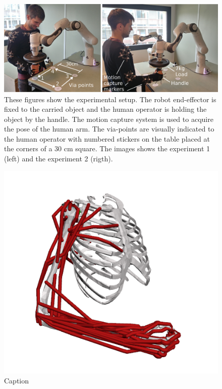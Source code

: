 \begin{figure}[!t]
    \centering
    \includegraphics[width=\linewidth]{Papers/images/both_pose_explanation.jpg}
    \caption{{These figures show the experimental setup. The robot end-effector is fixed to the carried object and the human operator is holding the object by the handle. The motion capture system is used to acquire the pose of the human arm. The via-points are visually indicated to the human operator with numbered stickers on the table placed at the corners of a 30 cm square. The images shows the experiment 1 (left) and the experiment 2 (rigth).}}
    \label{fig:experiment2}
\end{figure}

\begin{figure}
    \centering
    \includegraphics[width=\linewidth]{Papers/images/model_50m7dof.png}
    \caption{Caption}
    \label{fig:model_musc}
\end{figure}

